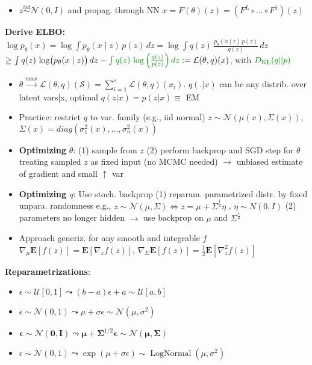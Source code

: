 \begin{itemize}
    \item \(z\overset{iid}{\sim} \mathcal{N}(0,I) \) and propag. through NN \(x=F(\theta)(z)=(F^L\circ\dots\circ F^1)(z)\)

\end{itemize} 
\textbf{Derive ELBO:} 
\(
\log p_\theta(x)
= \log \!\int p_\theta(x \mid z)\,p(z)\,dz
= \log \!\int q(z)\,\frac{p_\theta(x \mid z)\,p(z)}{q(z)}\,dz
\)\\
\(
\geq\int q(z)\,\log\bigl(p_\theta(x \mid z)\bigr)\,dz -{\textcolor{darkgreen}{\int q(z)\,\log\left(\tfrac{q(z)}{p(z)}\right)dz}} :=\mathcal{L}(\theta,q)(x)
\), with $\textcolor{darkgreen}{D_{\text{KL}}(q||p)}$
\begin{itemize}
    \item \(\theta \overset{max}{\rightarrow}\mathcal{L}(\theta,q)(\mathcal{S})= \sum_{i=1}^s\mathcal{L}(\theta,q)(x_i)\). \(q(.|x)\) can be any distrib. over latent vars|x, optimal \(q(z|x)=p(z|x)\equiv\) EM
    \item Practice: restrict \(q\) to var. family (e.g., iid normal) \(z\sim \mathcal{N}(\mu(x),\Sigma(x)),\) \(\Sigma(x)=diag(\sigma^2_1(x),\dots,\sigma^2_n(x))\) 
    \item \textbf{Optimizing} \(\theta\): (1) sample from \(z\) (2) perform backprop and SGD step for \(\theta\) treating sampled \(z\) as fixed input (no MCMC needed) \(\rightarrow\) unbiased estimate of gradient and small \(\uparrow\) var
    \item \textbf{Optimizing \(q\)}: Use stoch. backprop (1) reparam. parametrized distr. by fixed unpara. randomness e.g., \(z\sim \mathcal{N}(\mu,\Sigma)\Leftrightarrow z=\mu + \Sigma^{\frac{1}{2}}\eta\) , \(\eta\sim N(0,I)\) (2) parameters no longer hidden \(\rightarrow\) use backprop on \(\mu \) and \(\Sigma^{\frac{1}{2}}\)
    \item Approach generiz. for any smooth and integrable \(f\) \(\nabla_\mu\mathbf{E}[f(z)]=\mathbf{E}[\nabla_zf(z)]\), \(\nabla_\Sigma\mathbf{E}[f(z)]=\frac{1}{2}\mathbf{E}[\nabla^2_zf(z)]\)
\end{itemize}
\textbf{Reparametrizations}:
\begin{itemize}
    \item \(\epsilon\sim\mathcal{U}[0,1]\leadsto (b-a)\epsilon + a \sim \mathcal{U}[a, b]\)
    \item \(\epsilon \sim \mathcal{N}(0, 1) \leadsto \mu + \sigma \epsilon \sim \mathcal{N}(\mu, \sigma^2)\)
    \item \(\bm{\epsilon}\sim\mathcal{N}(\bm{0}, \bm{I})\leadsto \bm{\mu} + \bm{\Sigma}^{1/2}\bm{\epsilon}\sim\mathcal{N}(\bm{\mu}, \bm{\Sigma})\)
    \item \(\epsilon\sim\mathcal{N}(0, 1)\leadsto \exp(\mu + \sigma \epsilon)\sim \operatorname{LogNormal}(\mu, \sigma^2)\)
\end{itemize}
